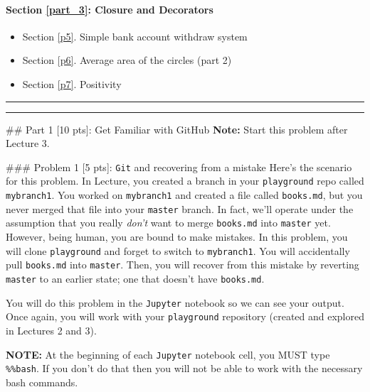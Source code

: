 \documentclass[11pt]{article}
\providecommand{\tightlist}{%
      \setlength{\itemsep}{0pt}\setlength{\parskip}{0pt}}
\begin{document}
\paragraph{\texorpdfstring{Section \ref{part_3}: Closure and
Decorators}{: Closure and Decorators}}\label{part-3-closure-and-decorators}

\begin{itemize}
\tightlist
\item
  Section \ref{p5}. Simple bank account withdraw system
\item
  Section \ref{p6}. Average area of the circles (part 2)
\item
  Section \ref{p7}. Positivity
\end{itemize}

\begin{center}\rule{0.5\linewidth}{\linethickness}\end{center}

    \begin{center}\rule{0.5\linewidth}{\linethickness}\end{center}

 \#\# Part 1 {[}10 pts{]}: Get Familiar with GitHub \textbf{Note:} Start
this problem after Lecture 3.

 \#\#\# Problem 1 {[}5 pts{]}: \texttt{Git} and recovering from a
mistake Here's the scenario for this problem. In Lecture, you created a
branch in your \texttt{playground} repo called \texttt{mybranch1}. You
worked on \texttt{mybranch1} and created a file called
\texttt{books.md}, but you never merged that file into your
\texttt{master} branch. In fact, we'll operate under the assumption that
you really \emph{don't} want to merge \texttt{books.md} into
\texttt{master} yet. However, being human, you are bound to make
mistakes. In this problem, you will clone \texttt{playground} and forget
to switch to \texttt{mybranch1}. You will accidentally pull
\texttt{books.md} into \texttt{master}. Then, you will recover from this
mistake by reverting \texttt{master} to an earlier state; one that
doesn't have \texttt{books.md}.

You will do this problem in the \texttt{Jupyter} notebook so we can see
your output. Once again, you will work with your \texttt{playground}
repository (created and explored in Lectures 2 and 3).

\textbf{NOTE:} At the beginning of each \texttt{Jupyter} notebook cell,
you MUST type \texttt{\%\%bash}. If you don't do that then you will not
be able to work with the necessary bash commands.
\end{document}
